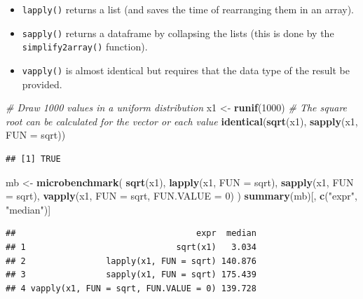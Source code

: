 \documentclass[
  12pt,
  american,
  a4paper,
  extrafontsizes,onecolumn,openright
  ]{memoir}
\newenvironment{Shaded}{\begin{snugshade}}{\end{snugshade}}
\newcommand{\AttributeTok}[1]{\textcolor[rgb]{0.13,0.29,0.53}{#1}}
\newcommand{\CommentTok}[1]{\textcolor[rgb]{0.56,0.35,0.01}{\textit{#1}}}
\newcommand{\DecValTok}[1]{\textcolor[rgb]{0.00,0.00,0.81}{#1}}
\newcommand{\FunctionTok}[1]{\textcolor[rgb]{0.13,0.29,0.53}{\textbf{#1}}}
\newcommand{\NormalTok}[1]{#1}
\newcommand{\OtherTok}[1]{\textcolor[rgb]{0.56,0.35,0.01}{#1}}
\newcommand{\StringTok}[1]{\textcolor[rgb]{0.31,0.60,0.02}{#1}}
\providecommand{\tightlist}{%
  \setlength{\itemsep}{0pt}\setlength{\parskip}{0pt}}
\begin{document}
\begin{itemize}
\tightlist
\item
  \texttt{lapply()} returns a list (and saves the time of rearranging them in an array).
\item
  \texttt{sapply()} returns a dataframe by collapsing the lists (this is done by the \texttt{simplify2array()} function).
\item
  \texttt{vapply()} is almost identical but requires that the data type of the result be provided.
\end{itemize}

\scriptsize

\begin{Shaded}
\begin{Highlighting}[]
\CommentTok{\# Draw 1000 values in a uniform distribution}
\NormalTok{x1 }\OtherTok{\textless{}{-}} \FunctionTok{runif}\NormalTok{(}\DecValTok{1000}\NormalTok{)}
\CommentTok{\# The square root can be calculated for the vector or each value }
\FunctionTok{identical}\NormalTok{(}\FunctionTok{sqrt}\NormalTok{(x1), }\FunctionTok{sapply}\NormalTok{(x1, }\AttributeTok{FUN =}\NormalTok{ sqrt))}
\end{Highlighting}
\end{Shaded}

\begin{verbatim}
## [1] TRUE
\end{verbatim}

\begin{Shaded}
\begin{Highlighting}[]
\NormalTok{mb }\OtherTok{\textless{}{-}} \FunctionTok{microbenchmark}\NormalTok{(}
  \FunctionTok{sqrt}\NormalTok{(x1), }
  \FunctionTok{lapply}\NormalTok{(x1, }\AttributeTok{FUN =}\NormalTok{ sqrt), }
  \FunctionTok{sapply}\NormalTok{(x1, }\AttributeTok{FUN =}\NormalTok{ sqrt), }
  \FunctionTok{vapply}\NormalTok{(x1, }\AttributeTok{FUN =}\NormalTok{ sqrt, }\AttributeTok{FUN.VALUE =} \DecValTok{0}\NormalTok{)}
\NormalTok{)}
\FunctionTok{summary}\NormalTok{(mb)[, }\FunctionTok{c}\NormalTok{(}\StringTok{"expr"}\NormalTok{, }\StringTok{"median"}\NormalTok{)]}
\end{Highlighting}
\end{Shaded}

\begin{verbatim}
##                                    expr  median
## 1                              sqrt(x1)   3.034
## 2                lapply(x1, FUN = sqrt) 140.876
## 3                sapply(x1, FUN = sqrt) 175.439
## 4 vapply(x1, FUN = sqrt, FUN.VALUE = 0) 139.728
\end{verbatim}
\end{document}
